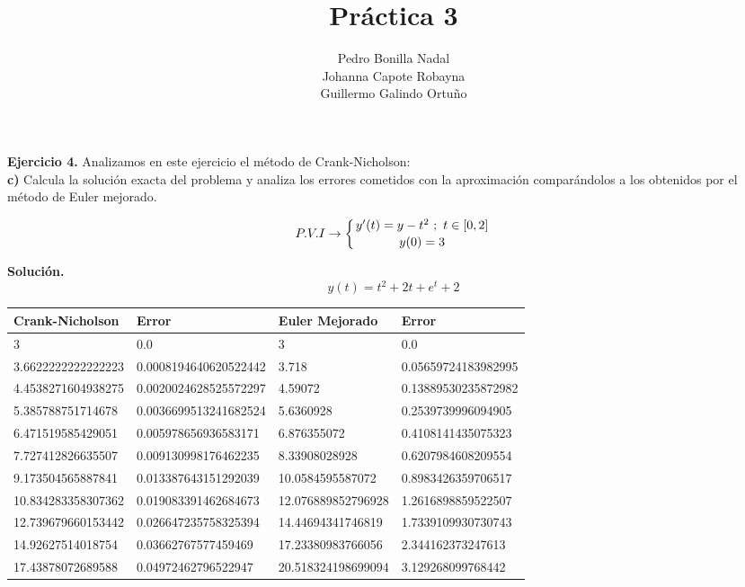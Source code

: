\documentclass[11pt]{article}
\title{\textbf{Práctica 3}}
\author{Pedro Bonilla Nadal\\
		Johanna Capote Robayna\\
		Guillermo Galindo Ortuño}
\date{}
\begin{document}
\maketitle

\textbf{Ejercicio 4.} Analizamos en este ejercicio el método de Crank-Nicholson: \\

\textbf{c)} Calcula la solución exacta del problema y analiza los errores cometidos con la aproximación comparándolos a los obtenidos por el método de Euler mejorado.

$$P.V.I  \rightarrow  \left\lbrace
y'(t) = y - t^2 \  ;\  t \in [0,2] \atop
y(0) = 3
\right. $$

\textbf{Solución.}
$$y(t) = t^2 + 2 t + e^t + 2$$

\begin{table}[h]
\centering

\begin{tabular}{|l|l|l|l|}
\hline
Crank-Nicholson           & Error                 & Euler Mejorado     & Error               \\ \hline
3                  & 0.0                   & 3                  & 0.0                 \\ \hline
3.6622222222222223 & 0.0008194640620522442 & 3.718              & 0.05659724183982995 \\ \hline
4.4538271604938275 & 0.0020024628525572297 & 4.59072            & 0.13889530235872982 \\ \hline
5.385788751714678  & 0.0036699513241682524 & 5.6360928          & 0.2539739996094905  \\ \hline
6.471519585429051  & 0.005978656936583171  & 6.876355072        & 0.4108141435075323  \\ \hline
7.727412826635507  & 0.009130998176462235  & 8.33908028928      & 0.6207984608209554  \\ \hline
9.173504565887841  & 0.013387643151292039  & 10.0584595587072   & 0.8983426359706517  \\ \hline
10.834283358307362 & 0.019083391462684673  & 12.076889852796928 & 1.2616898859522507  \\ \hline
12.739679660153442 & 0.026647235758325394  & 14.44694341746819  & 1.7339109930730743  \\ \hline
14.92627514018754  & 0.03662767577459469   & 17.23380983766056  & 2.344162373247613   \\ \hline
17.43878072689588  & 0.04972462796522947   & 20.518324198699094 & 3.129268099768442   \\ \hline
\end{tabular}
\end{table}
\end{document}
